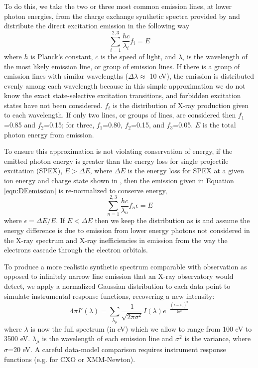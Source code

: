 \documentclass[draft]{agujournal2018}
\begin{document}
To do this, we take the two or three most common emission lines, at lower photon energies, from the charge exchange synthetic spectra provided by \citet{hui2010} and distribute the direct excitation emission in the following way
\begin{equation}
    \sum_{i=1}^{2,3}\frac{hc}{\lambda_{i}}f_{i}=E
    \label{eqn:DEemission}
\end{equation}
where $h$ is Planck's constant, $c$ is the speed of light, and $\lambda_{i}$ is the wavelength of the most likely emission line, or group of emission lines.
If there is a group of emission lines with similar wavelengths ($\Delta\lambda\approx$ 10 eV), the emission is distributed evenly among each wavelength because in this simple approximation we do not know the exact state-selective excitation transitions, and forbidden excitation states have not been considered.
$f_{i}$ is the distribution of X-ray production given to each wavelength.
If only two lines, or groups of lines, are considered then $f_{1}$=0.85 and $f_{2}$=0.15; for three, $f_{1}$=0.80, $f_{2}$=0.15, and $f_{3}$=0.05.
$E$ is the total photon energy from emission.

To ensure this approximation is not violating conservation of energy, if the emitted photon energy is greater than the energy loss for single projectile excitation (SPEX), $E>\Delta E$, where $\Delta E$ is the energy loss for SPEX at a given ion energy and charge state shown in \citet{schultz2019}, then the emission given in Equation \ref{eqn:DEemission} is re-normalized to conserve energy,
\begin{equation}
    \sum_{n=1}^{2,3}\frac{hc}{\lambda_{n}}f_{n}\epsilon=E
\end{equation}
where $\epsilon=\Delta E/E$.
If $E<\Delta E$ then we keep the distribution as is and assume the energy difference is due to emission from lower energy photons not considered in the X-ray spectrum and X-ray inefficiencies in emission from the way the electrons cascade through the electron orbitals.

To produce a more realistic synthetic spectrum comparable with observation as opposed to infinitely narrow line emission that an X-ray observatory would detect, we apply a normalized Gaussian distribution to each data point to simulate instrumental response functions, recovering a new intensity:
\begin{equation}
    4\pi I'(\lambda)=\sum_{\lambda_{\mu}}\frac{1}{\sqrt{2\pi\sigma^2}}I(\lambda)e^{-\frac{(\lambda-\lambda_{\mu})^2}{2\sigma^2}}
\end{equation}
where $\lambda$ is now the full spectrum (in eV) which we allow to range from 100 eV to 3500 eV.
$\lambda_{\mu}$ is the wavelength of each emission line and $\sigma^2$ is the variance, where $\sigma$=20 eV.
A careful data-model comparison requires instrument response functions (e.g. for CXO or XMM-Newton).
\end{document}
